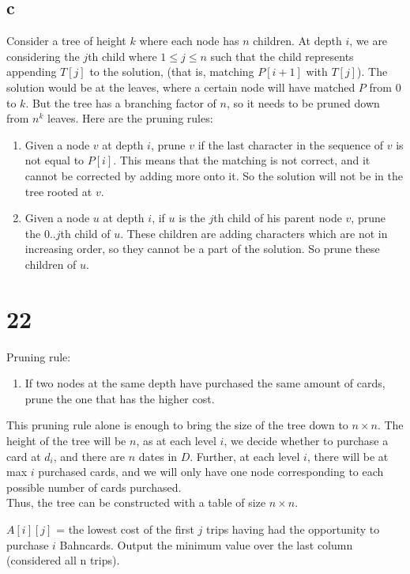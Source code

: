\documentclass[letterpaper,notitlepage,twoside]{article}
\begin{document}
\subsection*{c}
Consider a tree of height $k$ where each node has $n$ children. At depth $i$, we are considering the $j$th child where $1 \leq j \leq n$  such that the child represents appending $T[j]$ to the solution, (that is, matching $P[i + 1]$ with $T[j]$). The solution would be at the leaves, where a certain node will have matched $P$ from $0$ to $k$. But the tree has a branching factor of $n$, so it needs to be pruned down from $n^k$ leaves. Here are the pruning rules:
\begin{enumerate}
\item Given a node $v$ at depth $i$, prune $v$ if the last character in the sequence of $v$ is not equal to $P[i]$. This means that the matching is not correct, and it cannot be corrected by adding more onto it. So the solution will not be in the tree rooted at $v$.
\item Given a node $u$ at depth $i$, if $u$ is the $j$th child of his parent node $v$, prune the $0..j$th child of $u$. These children are adding characters which are not in increasing order, so they cannot be a part of the solution. So prune these children of $u$.
\end{enumerate}

\section*{22}
Pruning rule:
\begin{enumerate}
\item If two nodes at the same depth have purchased the same amount of cards, prune the one that has the higher cost. 
\end{enumerate}
This pruning rule alone is enough to bring the size of the tree down to $n\times n$. The height of the tree will be $n$, as at each level $i$, we decide whether to purchase a card at $d_i$, and there are $n$ dates in $D$. Further, at each level $i$, there will be at max $i$ purchased cards, and we will only have one node corresponding to each possible number of cards purchased.  \\
Thus, the tree can be constructed with a table of size $n\times n$.

$A[i][j]$ = the lowest cost of the first $j$ trips having had the opportunity to purchase $i$ Bahncards. Output the minimum value over the last column (considered all n trips). 
\end{document}
